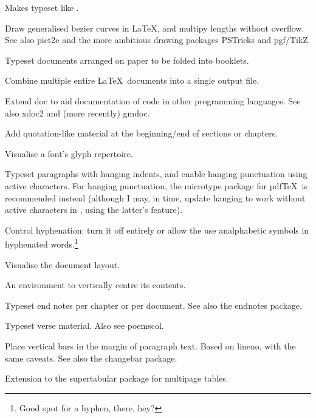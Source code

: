 \documentclass{ltugboat}
\begin{document}
\begin{description}[font=\normalfont\sffamily]
\item [anonchap] Makes  typeset like .

\item [bez123 \& multiply] Draw generalised bezier curves in \LaTeX, and multipy lengths without overflow. See also \textsf{pict2e} and the more ambitious drawing packages \textsf{PSTricks} and \textsf{pgf/TikZ}.

\item [booklet]  Typeset documents arranged on paper to be folded into booklets.
\item [combine]  Combine multiple entire \LaTeX\ documents into a single output file.

\item [docmfp] Extend \textsf{doc} to aid documentation of code in other programming languages. See also \textsf{xdoc2} and (more recently) \textsf{gmdoc}.

\item [epigraph] Add quotation-like material at the beginning/end of sections or chapters.

\item [fonttable] Visualise a font's glyph repertoire.

\item [hanging]  Typeset paragraphs with hanging indents, and enable hanging punctuation using active characters. For hanging punctuation, the \textsf{microtype} package for pdf\/\TeX\ is recommended instead (although I may, in time, update \textsf{hanging} to work without active characters in \XeTeX, using the latter's  feature).
\item [hyphenat] Control hyphenation: turn it off entirely or allow the use analphabetic symbols in hyphenated words.\footnote{Good spot for a hyphen, there, hey?}
\item [layouts] Visualise the document layout.
\item [midpage] An environment to vertically centre its contents.
\item [pagenote] Typeset end notes per chapter or per document. See also the \textsf{endnotes} package.
\item [verse] Typeset verse material. Also see \textsf{poemscol}.
\item [vertbars] Place vertical bars in the margin of paragraph text. Based on \textsf{lineno}, with the same caveats. See also the \textsf{changebar} package.
\item [xtab] Extension to the \textsf{supertabular} package for multipage tables.
\end{description}
\end{document}
